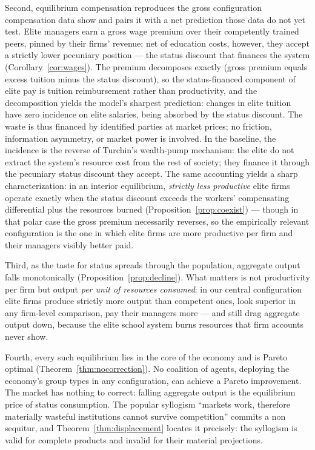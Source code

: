 \documentclass[12pt,letterpaper]{article}
\theoremstyle{definition}
\begin{document}
Second, equilibrium compensation reproduces the gross configuration compensation data show and pairs it with a net prediction those data do not yet test.
Elite managers earn a gross wage premium over their competently trained peers, pinned by their firms' revenue; net of education costs, however, they accept a strictly lower pecuniary position --- the status discount that finances the system (Corollary~\ref{cor:wages}).
The premium decomposes exactly (gross premium equals excess tuition minus the status discount), so the status-financed component of elite pay is tuition reimbursement rather than productivity, and the decomposition yields the model's sharpest prediction: changes in elite tuition have zero incidence on elite salaries, being absorbed by the status discount.
The waste is thus financed by identified parties at market prices; no friction, information asymmetry, or market power is involved.
In the baseline, the incidence is the reverse of Turchin's wealth-pump mechanism: the elite do not extract the system's resource cost from the rest of society; they finance it through the pecuniary status discount they accept.
The same accounting yields a sharp characterization: in an interior equilibrium, \emph{strictly less productive} elite firms operate exactly when the status discount exceeds the workers' compensating differential plus the resources burned (Proposition~\ref{prop:coexist}) --- though in that polar case the gross premium necessarily reverses, so the empirically relevant configuration is the one in which elite firms are more productive per firm and their managers visibly better paid.

Third, as the taste for status spreads through the population, aggregate output falls monotonically (Proposition~\ref{prop:decline}).
What matters is not productivity per firm but output \emph{per unit of resources consumed}: in our central configuration elite firms produce strictly more output than competent ones, look superior in any firm-level comparison, pay their managers more --- and still drag aggregate output down, because the elite school system burns resources that firm accounts never show.

Fourth, every such equilibrium lies in the core of the economy and is Pareto optimal (Theorem~\ref{thm:nocorrection}).
No coalition of agents, deploying the economy's group types in any configuration, can achieve a Pareto improvement.
The market has nothing to correct: falling aggregate output is the equilibrium price of status consumption.
The popular syllogism ``markets work, therefore materially wasteful institutions cannot survive competition'' commits a non sequitur, and Theorem~\ref{thm:displacement} locates it precisely: the syllogism is valid for complete products and invalid for their material projections.
\end{document}
